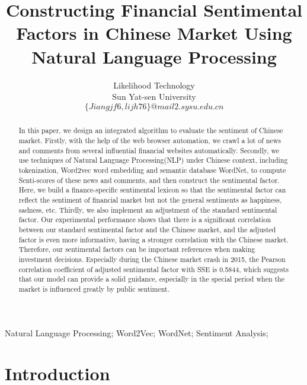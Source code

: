 \documentclass[10pt, conference, compsocconf]{IEEEtran}
\begin{document}
\title{Constructing Financial Sentimental Factors in Chinese Market Using Natural Language Processing}
\author
{
\IEEEauthorblockA
{
Likelihood Technology\\
}
\IEEEauthorblockA
{
Sun Yat-sen University\\
}
$ $\\
$\{Jiangjf6,lijh76\}@mail2.sysu.edu.cn$
}

\maketitle
\begin{abstract}
In this paper, we design an integrated algorithm to evaluate the sentiment of Chinese market. Firstly, with the help of the web browser automation, we crawl a lot of news and comments from several influential financial websites automatically. Secondly, we use techniques of Natural Language Processing(NLP) under Chinese context, including tokenization, Word2vec word embedding and semantic database WordNet, to compute Senti-scores of these news and comments, and then construct the sentimental factor. Here, we build a finance-specific sentimental lexicon so that the sentimental factor can reflect the sentiment of financial market but not the general sentiments as happiness, sadness, etc. Thirdly, we also implement an adjustment of the standard sentimental factor. Our experimental performance shows that there is a significant correlation between our standard sentimental factor and the Chinese market, and the adjusted factor is even more informative, having a stronger correlation with the Chinese market. Therefore, our sentimental factors can be important references when making investment decisions. Especially during the Chinese market crash in 2015, the Pearson correlation coefficient of adjusted sentimental factor with SSE is 0.5844, which suggests that our model can provide a solid guidance, especially in the special period when the market is influenced greatly by public sentiment.
\end{abstract}

\begin{IEEEkeywords}
Natural Language Processing; Word2Vec; WordNet; Sentiment Analysis;
\end{IEEEkeywords}

\IEEEpeerreviewmaketitle
\section{Introduction}
\end{document}
